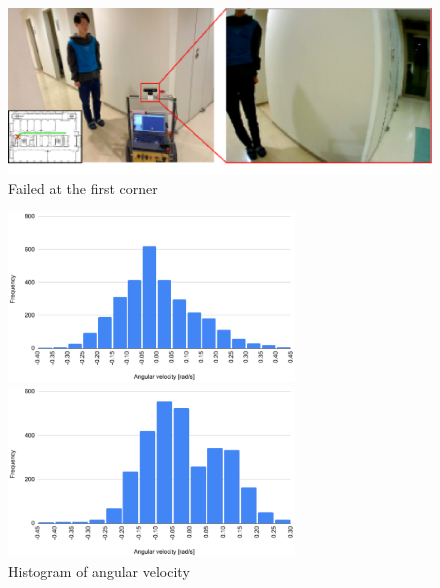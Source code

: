 \newpage

  \begin{figure}[h]
    \centering
    \includegraphics[keepaspectratio, scale=0.80] {images/eps/RobotGuidance_failed_place}
    \captionsetup{justification=raggedright} %
    \caption{Failed at the first corner}
    \label{Fig:RobotGuidance_failed_place}
  \end{figure}

  \begin{figure}[h]
    \centering
    \begin{minipage}[c]{65mm} 
        \centering
        \includegraphics[height=45mm]{images/eps/RobotGuidance_success_histogram}
    \end{minipage}
    \begin{minipage}[c]{65mm} 
        \centering
        \includegraphics[height=45mm]{images/eps/RobotGuidance_failed_histogram}
    \end{minipage}
    \caption{Histogram of angular velocity}
    \label{Fig:Histogram of angular velocity}
  \end{figure}

\newpage
